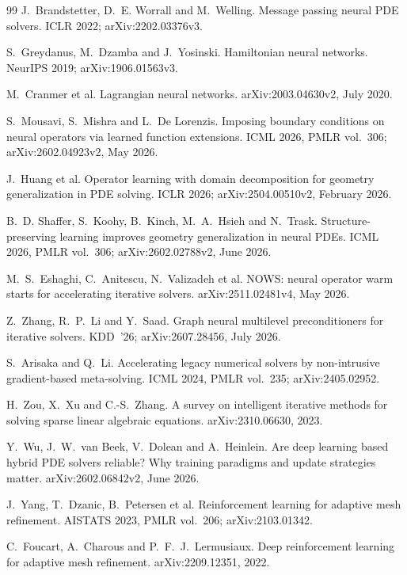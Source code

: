 \documentclass[11pt, a4paper]{article}
\begin{document}
\begin{thebibliography}{99}
 J.~Brandstetter, D.~E. Worrall and M.~Welling.
Message passing neural PDE solvers. ICLR 2022; arXiv:2202.03376v3.

 S.~Greydanus, M.~Dzamba and J.~Yosinski. Hamiltonian neural
networks. NeurIPS 2019; arXiv:1906.01563v3.

 M.~Cranmer et al. Lagrangian neural networks.
arXiv:2003.04630v2, July 2020.

 S.~Mousavi, S.~Mishra and L.~De Lorenzis. Imposing
boundary conditions on neural operators via learned function extensions.
ICML 2026, PMLR vol.~306; arXiv:2602.04923v2, May 2026.

 J.~Huang et al. Operator learning with domain
decomposition for geometry generalization in PDE solving. ICLR 2026; arXiv:2504.00510v2, February 2026.

 B.~D. Shaffer, S.~Koohy, B.~Kinch,
M.~A.~Hsieh and N.~Trask. Structure-preserving learning improves geometry
generalization in neural PDEs. ICML 2026, PMLR vol.~306; arXiv:2602.02788v2,
June 2026.

 M.~S.~Eshaghi, C.~Anitescu, N.~Valizadeh et al. NOWS:
neural operator warm starts for accelerating iterative solvers.
arXiv:2511.02481v4, May 2026.

 Z.~Zhang, R.~P.~Li and Y.~Saad. Graph neural
multilevel preconditioners for iterative solvers. KDD~'26;
arXiv:2607.28456, July 2026.

 S.~Arisaka and Q.~Li. Accelerating legacy numerical
solvers by non-intrusive gradient-based meta-solving. ICML 2024, PMLR
vol.~235; arXiv:2405.02952.

 H.~Zou, X.~Xu and C.-S.~Zhang. A survey on
intelligent iterative methods for solving sparse linear algebraic equations.
arXiv:2310.06630, 2023.

 Y.~Wu, J.~W.~van Beek, V.~Dolean and
A.~Heinlein. Are deep learning based hybrid PDE solvers reliable? Why
training paradigms and update strategies matter. arXiv:2602.06842v2, June
2026.

 J.~Yang, T.~Dzanic, B.~Petersen et al. Reinforcement
learning for adaptive mesh refinement. AISTATS 2023, PMLR vol.~206;
arXiv:2103.01342.

 C.~Foucart, A.~Charous and P.~F.~J.~Lermusiaux. Deep
reinforcement learning for adaptive mesh refinement. arXiv:2209.12351, 2022.


\end{thebibliography}
\end{document}
